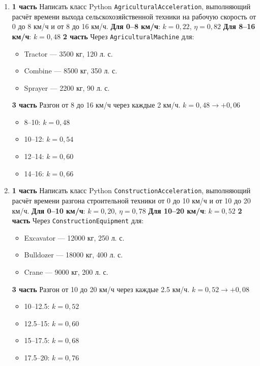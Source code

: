 \begin{enumerate}
    \item[11] \textbf{1 часть}  
    Написать класс Python \texttt{AgriculturalAcceleration}, выполняющий расчёт времени выхода сельскохозяйственной техники на рабочую скорость от 0 до 8 км/ч и от 8 до 16 км/ч.  
    \textbf{Для 0–8 км/ч}: $k = 0{,}22$, $\eta = 0{,}82$  
    \textbf{Для 8–16 км/ч}: $k = 0{,}48$  
    \textbf{2 часть}  
    Через \texttt{AgriculturalMachine} для:  
    \begin{itemize}
        \item Tractor — 3500 кг, 120 л. с.  
        \item Combine — 8500 кг, 350 л. с.  
        \item Sprayer — 2200 кг, 90 л. с.  
    \end{itemize}
    \textbf{3 часть}  
    Разгон от 8 до 16 км/ч через каждые 2 км/ч. $k = 0{,}48 \to +0{,}06$  
    \begin{itemize}
        \item 8–10: $k = 0{,}48$  
        \item 10–12: $k = 0{,}54$  
        \item 12–14: $k = 0{,}60$  
        \item 14–16: $k = 0{,}66$  
    \end{itemize}

    \item[12] \textbf{1 часть}  
    Написать класс Python \texttt{ConstructionAcceleration}, выполняющий расчёт времени разгона строительной техники от 0 до 10 км/ч и от 10 до 20 км/ч.  
    \textbf{Для 0–10 км/ч}: $k = 0{,}20$, $\eta = 0{,}78$  
    \textbf{Для 10–20 км/ч}: $k = 0{,}52$  
    \textbf{2 часть}  
    Через \texttt{ConstructionEquipment} для:  
    \begin{itemize}
        \item Excavator — 12000 кг, 250 л. с.  
        \item Bulldozer — 18000 кг, 400 л. с.  
        \item Crane — 9000 кг, 200 л. с.  
    \end{itemize}
    \textbf{3 часть}  
    Разгон от 10 до 20 км/ч через каждые 2.5 км/ч. $k = 0{,}52 \to +0{,}08$  
    \begin{itemize}
        \item 10–12.5: $k = 0{,}52$  
        \item 12.5–15: $k = 0{,}60$  
        \item 15–17.5: $k = 0{,}68$  
        \item 17.5–20: $k = 0{,}76$  
    \end{itemize}


\end{enumerate}
